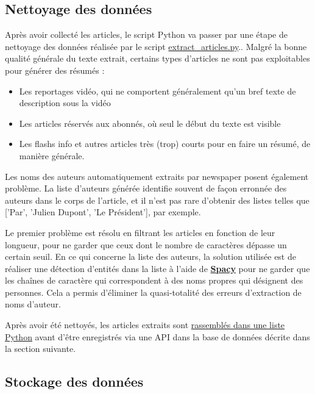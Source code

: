 \documentclass[french]{article}
\begin{document}
    \subsection{Nettoyage des données}
    Après avoir collecté les articles, le script Python va passer par une étape de nettoyage des données réalisée par le script \href{https://github.com/vinpap/your_news_anchor/blob/main/extract_articles.py}{extract\_articles.py}.. Malgré la bonne qualité générale du texte extrait, certains types d'articles ne sont pas exploitables pour générer des résumés :
    \begin{itemize}
        \item Les reportages vidéo, qui ne comportent généralement qu'un bref texte de description sous la vidéo
        \item Les articles réservés aux abonnés, où seul le début du texte est visible
        \item Les flashs info et autres articles très (trop) courts pour en faire un résumé, de manière générale.
    \end{itemize}
    Les noms des auteurs automatiquement extraits par newspaper posent également problème. La liste d'auteurs générée identifie souvent de façon erronnée des auteurs dans le corps de l'article, et il n'est pas rare d'obtenir des listes telles que ['Par', 'Julien Dupont', 'Le Président'], par exemple.

    Le premier problème est résolu en filtrant les articles en fonction de leur longueur, pour ne garder que ceux dont le nombre de caractères dépasse un certain seuil.
    En ce qui concerne la liste des auteurs, la solution utilisée est de réaliser une détection d'entités dans la liste à l'aide de \textbf{\href{https://spacy.io/}{Spacy}} pour ne garder que les chaînes de caractère qui correspondent à des noms propres qui désignent des personnes. Cela a permis d'éliminer la quasi-totalité des erreurs d'extraction de noms d'auteur.

    Après avoir été nettoyés, les articles extraits sont \href{https://github.com/vinpap/your_news_anchor/blob/5deffe3be7453d998b2377548902759869e1926d/extract_articles.py#L51}{rassemblés dans une liste Python} avant d'être enregistrés via une API dans la base de données décrite dans la section suivante.

    \subsection{Stockage des données}
\end{document}
